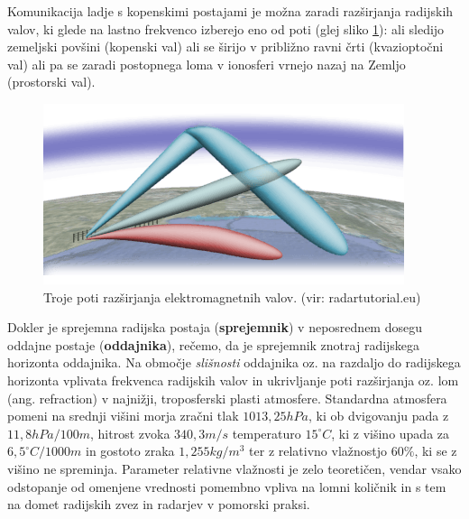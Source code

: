 Komunikacija ladje s kopenskimi postajami je možna zaradi razširjanja radijskih valov, ki glede na lastno frekvenco izberejo eno od poti (glej sliko \ref{fig:PotiRazsirjanjaEmv}): ali sledijo zemeljski povšini (kopenski val) ali se širijo v približno ravni črti (kvazioptočni val) ali pa se zaradi postopnega loma v ionosferi vrnejo nazaj na Zemljo (prostorski val). 

\begin{figure}
	\centering
	\includegraphics[width=\textwidth]{Predavanja/01_Uvod/figs/PotiRazsirjenjaValov.png}
	\caption{Troje poti razširjanja elektromagnetnih valov. (vir: radartutorial.eu)}
	\label{fig:PotiRazsirjanjaEmv}       
\end{figure}


Dokler je sprejemna radijska postaja (\textbf{sprejemnik}) v neposrednem dosegu oddajne postaje (\textbf{oddajnika}), rečemo, da je sprejemnik znotraj radijskega horizonta oddajnika. Na območje \textit{slišnosti} oddajnika oz. na razdaljo do radijskega horizonta vplivata frekvenca radijskih valov in ukrivljanje poti razširjanja oz. lom (ang. refraction) v najnižji, troposferski plasti atmosfere. Standardna atmosfera pomeni na srednji višini morja zračni tlak $1013,25hPa$, ki ob dvigovanju pada z $11,8hPa/100m$, hitrost zvoka $340,3 m/s$ temperaturo $15^{\circ}C$, ki z višino upada za $6,5^{\circ}C/1000m$  in gostoto zraka $1,255kg/m^3$ ter z relativno vlažnostjo $60\%$, ki se z višino ne spreminja. Parameter relativne vlažnosti je zelo teoretičen, vendar vsako odstopanje od omenjene vrednosti pomembno vpliva na lomni količnik in s tem na domet radijskih zvez in radarjev v pomorski praksi. 


